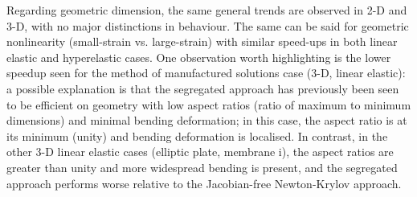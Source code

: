 \documentclass[sn-mathphys,Numbered]{sn-jnl}%
\begin{document}
Regarding geometric dimension, the same general trends are observed in 2-D and 3-D, with no major distinctions in behaviour.
The same can be said for geometric nonlinearity (small-strain vs. large-strain) with similar speed-ups in both linear elastic and hyperelastic cases.
One observation worth highlighting is the lower speedup seen for the method of manufactured solutions case (3-D, linear elastic): a possible explanation is that the segregated approach has previously been seen to be efficient on geometry with low aspect ratios (ratio of maximum to minimum dimensions) and minimal bending deformation; in this case, the aspect ratio is at its minimum (unity) and bending deformation is localised.
In contrast, in the other 3-D linear elastic cases (elliptic plate, membrane i), the aspect ratios are greater than unity and more widespread bending is present, and the segregated approach performs worse relative to the Jacobian-free Newton-Krylov approach. 



\end{document}
